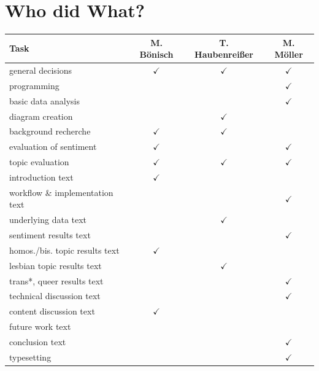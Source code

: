 \documentclass[10pt,a4paper,twocolumn]{scrartcl}
\begin{document}
{\footnotesize }

\onecolumn

\newpage

\section*{Who did What?}

\renewcommand{\arraystretch}{1.5}
\begin{center}
\begin{tabular}{lccc}
\toprule
Task		& M. Bönisch & T. Haubenreißer & M. Möller\\
\midrule
general decisions & $\checkmark$ & $\checkmark$ & $\checkmark$\\
programming & & & $\checkmark$\\
basic data analysis  & & & $\checkmark$\\
diagram creation  & & $\checkmark$ &\\
background recherche & $\checkmark$ & $\checkmark$ & \\
evaluation of sentiment & $\checkmark$ & & $\checkmark$\\
topic evaluation & $\checkmark$ & $\checkmark$ & $\checkmark$\\
introduction text & $\checkmark$ & & \\
workflow \& implementation text & & & $\checkmark$\\
underlying data text & & $\checkmark$ &\\
sentiment results text & & & $\checkmark$\\
homos./bis. topic results text & $\checkmark$ & & \\
lesbian topic results text & & $\checkmark$ & \\
trans*, queer results text & & & $\checkmark$\\
technical discussion text & & & $\checkmark$\\
content discussion text & $\checkmark$ & &\\
future work text\\
conclusion text & & & $\checkmark$\\
typesetting  & & & $\checkmark$\\
\bottomrule
\end{tabular}
\end{center}
\renewcommand{\arraystretch}{1}
\end{document}
